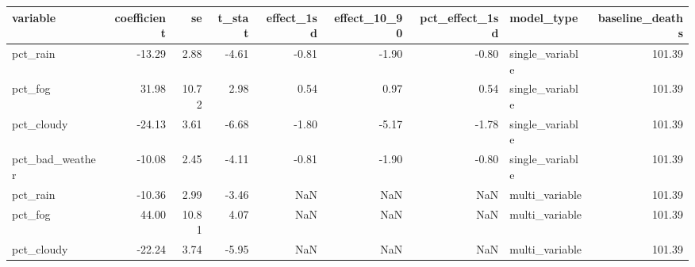 \begin{tabular}{lrrrrrrlr}
\toprule
variable & coefficient & se & t\_stat & effect\_1sd & effect\_10\_90 & pct\_effect\_1sd & model\_type & baseline\_deaths \\
\midrule
pct\_rain & -13.29 & 2.88 & -4.61 & -0.81 & -1.90 & -0.80 & single\_variable & 101.39 \\
pct\_fog & 31.98 & 10.72 & 2.98 & 0.54 & 0.97 & 0.54 & single\_variable & 101.39 \\
pct\_cloudy & -24.13 & 3.61 & -6.68 & -1.80 & -5.17 & -1.78 & single\_variable & 101.39 \\
pct\_bad\_weather & -10.08 & 2.45 & -4.11 & -0.81 & -1.90 & -0.80 & single\_variable & 101.39 \\
pct\_rain & -10.36 & 2.99 & -3.46 & NaN & NaN & NaN & multi\_variable & 101.39 \\
pct\_fog & 44.00 & 10.81 & 4.07 & NaN & NaN & NaN & multi\_variable & 101.39 \\
pct\_cloudy & -22.24 & 3.74 & -5.95 & NaN & NaN & NaN & multi\_variable & 101.39 \\
\bottomrule
\end{tabular}
